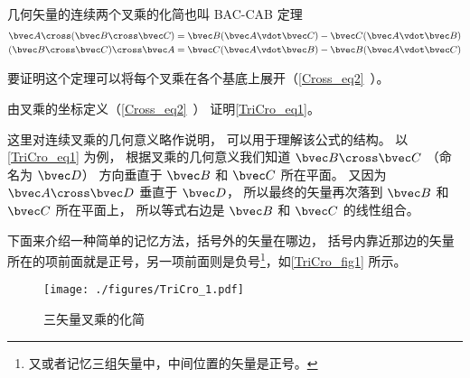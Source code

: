 

几何矢量的连续两个叉乘的化简也叫 BAC-CAB 定理
\begin{gather}
\bvec A \cross (\bvec B \cross \bvec C) = \bvec B (\bvec A \vdot \bvec C) - \bvec C (\bvec A \vdot \bvec B)\label{TriCro_eq1}\\
(\bvec B \cross \bvec C) \cross \bvec A = \bvec C (\bvec A \vdot \bvec B) - \bvec B (\bvec A \vdot \bvec C)
\end{gather}

要证明这个定理可以将每个叉乘在各个基底上展开（\autoref{Cross_eq2}~）。

\begin{exercise}{}
由叉乘的坐标定义（\autoref{Cross_eq2}~） 证明\autoref{TriCro_eq1}。
\end{exercise} 

这里对连续叉乘的几何意义略作说明， 可以用于理解该公式的结构。 以\autoref{TriCro_eq1} 为例， 根据叉乘的几何意义我们知道 $\bvec B \cross \bvec C$ （命名为 $\bvec D$） 方向垂直于 $\bvec B$ 和 $\bvec C$ 所在平面。 又因为 $\bvec A \cross \bvec D$ 垂直于 $\bvec D$， 所以最终的矢量再次落到 $\bvec B$ 和 $\bvec C$ 所在平面上， 所以等式右边是 $\bvec B$ 和 $\bvec C$ 的线性组合。

下面来介绍一种简单的记忆方法，括号外的矢量在哪边， 括号内靠近那边的矢量所在的项前面就是正号，另一项前面则是负号\footnote{又或者记忆三组矢量中，中间位置的矢量是正号。}，如\autoref{TriCro_fig1} 所示。

\begin{figure}[ht]
\centering
\texttt{[image: ./figures/TriCro\_1.pdf]}
\caption{三矢量叉乘的化简}\label{TriCro_fig1}
\end{figure}
